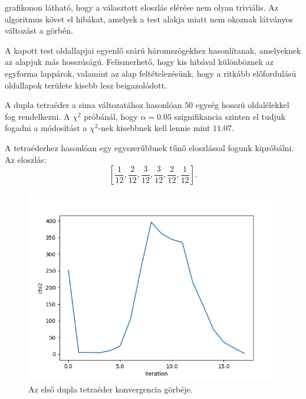  grafikonon látható, hogy a választott eloszlás elérése nem olyan triviális.
Az algoritmus követ el hibákat, amelyek a test alakja miatt nem okoznak látványos változást a görbén.

A kapott test oldallapjai egyenlő szárú háromszögekhez hasonlítanak, amelyeknek az alapjuk más hosszúságú.
Felismerhető, hogy kis hibával különböznek az egyforma lappárok, valamint az alap feltételezésünk, hogy a ritkább előfordulású oldallapok területe kisebb lesz beigazolódott.

\newpage


A dupla tetraéder a sima változatához hasonlóan $50$ egység hosszú oldalélekkel fog rendelkezni.
A $\chi^2$ próbánál, hogy $\alpha = 0.05$ szignifikancia szinten el tudjuk fogadni a módosítást a $\chi^2$-nek kisebbnek kell lennie mint $11.07$.

A tetraéderhez hasonlóan egy egyszerűbbnek tűnő eloszlással fogunk kipróbálni.
Az eloszlás:
\[
\left[\frac{1}{12}, \frac{2}{12}, \frac{3}{12}, \frac{3}{12}, \frac{2}{12}, \frac{1}{12}\right].
\]

\begin{figure}[h!]
	\centering
	\includegraphics[scale=0.7]{images/doubletetrahedron_01.png}
	\caption{Az első dupla tetraéder konvergencia görbéje.}
	\label{fig:doubletetra01}
\end{figure}


